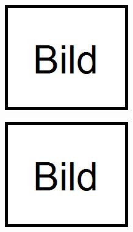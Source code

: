 \begin{minipage}{\linewidth}
%
\begin{minipage}{\linewidth}
		\Centering
	\begin{minipage}{0.4\linewidth}
		\Centering
    \includegraphics [width=0.6\linewidth]{Bilder/bild}
  \end{minipage}%
 \hspace{0.1\linewidth}
  \begin{minipage}{0.4\linewidth}
		\Centering
    \includegraphics [width=0.6\linewidth]{Bilder/bild}
  \end{minipage}
\end{minipage}



\end{minipage}
